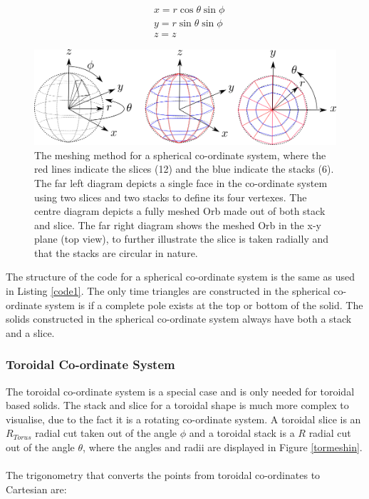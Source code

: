 \documentclass[12pt,a4paper]{article}
\begin{document}
\begin{equation}
\begin{aligned}
& x = r \cos{\theta}\sin{\phi}\\
& y = r \sin{\theta}\sin{\phi} \\
& z = z
\end{aligned}
\label{trigsph}
\end{equation}
\begin{figure}[h!]
\centering
\includegraphics[scale=0.5]{Images//Coords//sph.png}
\caption[width=\columnwidth]{The meshing method for a spherical co-ordinate system, where the red lines indicate the slices (12) and the blue indicate the stacks (6). The far left diagram depicts a single face in the co-ordinate system using two slices and two stacks to define its four vertexes. The centre diagram depicts a fully meshed Orb made out of both stack and slice. The far right diagram shows the meshed Orb in the x-y plane (top view), to further illustrate the slice is taken radially and that the stacks are circular in nature.}
\label{sphmeshin}
\end{figure}

\noindent The structure of the code for a spherical co-ordinate system is the same as used in Listing \ref{code1}. The only time triangles are constructed in the spherical co-ordinate system is if a complete pole exists at the top or bottom of the solid. The solids constructed in the spherical co-ordinate system always have both a stack and a slice.

\newpage
\subsubsection{Toroidal Co-ordinate System}
\label{too}
The toroidal co-ordinate system is a special case and is only needed for toroidal based solids. The stack and slice for a toroidal shape is much more complex to visualise, due to the fact it is a rotating co-ordinate system. A toroidal slice is an $R_{Torus}$ radial cut taken out of the angle $\phi$ and a toroidal stack is a $R$ radial cut out of the angle $\theta$, where the angles and radii are displayed in Figure \ref{tormeshin}. 
\\\\
The trigonometry that converts the points from toroidal co-ordinates to Cartesian are:
\end{document}
